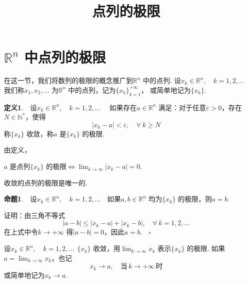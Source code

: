 \documentclass{article}
\title{点列的极限}
\author{}
\date{}
\begin{document}
\maketitle

\section{\(\mathbb{R}^n\) 中点列的极限}
\noindent 在这一节，我们将数列的极限的概念推广到\(\mathbb{R}^n\) 中的点列. 设\(x_k \in \mathbb{R}^n,\quad k = 1, 2,\dots \) 我们称\(x_1,x_2,\dots \) 为\(\mathbb{R}^n\) 中的点列，记为\(\{x_k\}_{k = 1}^{ + \infty } \)， 或简单地记为\(\{x_k\} \).

\vspace{20pt}
\noindent \textbf{定义1}.\ \ 设\(x_k \in \mathbb{R}^n,\quad k = 1,2,\dots \quad \) 如果存在\(a \in \mathbb{R}^n\) 满足：对于任意\(\varepsilon > 0\)，存在\(N \in \mathbb{N}^{*}\)，使得
\begin{equation*}
    | x_k - a |< \varepsilon ,\quad \forall\ k \ge N
\end{equation*}
称\(\{x_k\} \) 收敛，称\(a\) 是\(\{x_k\}\) 的极限.

\vspace{20pt}

\noindent 由定义，
\begin{center}
    \(a\) 是点列\(\{x_k\} \) 的极限\(\iff \displaystyle\lim_{k \to \infty }| x_k - a |= 0  \).
\end{center}

\newpage

\noindent 收敛的点列的极限是唯一的.

\vspace{20pt}
\noindent \textbf{命题1}.\ \ 设\(x_k \in \mathbb{R}^n,\quad k = 1,2,\dots \)\ \ 如果\(a, b \in \mathbb{R}^n\) 均为\(\{x_k\} \) 的极限，则\(a = b\).
\vspace{20pt}

\noindent 证明：由三角不等式
\begin{equation*}
    | a - b | \le | x_k - a |+ | x_k - b |,\quad \forall \ k = 1,2,\dots
\end{equation*}
在上式中令\(k \to + \infty \) 得\(| a - b |= 0 \)，因此\(a = b.\quad \square\)

\vspace{20pt}

\noindent 设\(x_k \in \mathbb{R}^n,\quad k = 1,2,\dots \ \ \{x_k\} \) 收敛，用\(\displaystyle\lim_{k \to \infty }x_k \) 表示\(\{x_k\} \) 的极限. 如果\(a = \displaystyle\lim_{k \to \infty }x_k \)，也记
\begin{equation*}
    x_k \to a,\quad \text{当}\,k \to + \infty \,\text{时}
\end{equation*}
或简单地记为\(x_k \to a\).
\end{document}
